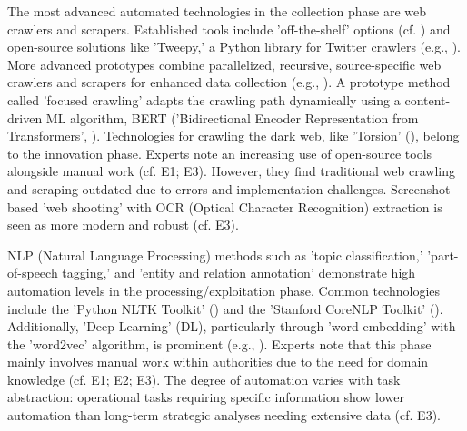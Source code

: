 \documentclass[10pt]{article}
\begin{document}
The most advanced automated technologies in the collection phase are web crawlers and scrapers. Established tools include 'off-the-shelf' options (cf. \cite{Middleton.2020}) and open-source solutions like 'Tweepy,' a Python library for Twitter crawlers (e.g., \cite{Adewopo.2020}). More advanced prototypes combine parallelized, recursive, source-specific web crawlers and scrapers for enhanced data collection (e.g., \cite{Jenkins.2021}). A prototype method called 'focused crawling' adapts the crawling path dynamically using a content-driven ML algorithm, BERT ('Bidirectional Encoder Representation from Transformers', \cite{Kuehn.2023}). Technologies for crawling the dark web, like 'Torsion' (\cite{Sonawane.2022}), belong to the innovation phase. Experts note an increasing use of open-source tools alongside manual work (cf. E1; E3). However, they find traditional web crawling and scraping outdated due to errors and implementation challenges. Screenshot-based 'web shooting' with OCR (Optical Character Recognition) extraction is seen as more modern and robust (cf. E3).

NLP (Natural Language Processing) methods such as 'topic classification,' 'part-of-speech tagging,' and 'entity and relation annotation' demonstrate high automation levels in the processing/exploitation phase. Common technologies include the 'Python NLTK Toolkit' (\cite{Hubbard.2022}) and the 'Stanford CoreNLP Toolkit' (\cite{Middleton.2020}). Additionally, 'Deep Learning' (DL), particularly through 'word embedding' with the 'word2vec' algorithm, is prominent (e.g., \cite{Bai.2020}). Experts note that this phase mainly involves manual work within authorities due to the need for domain knowledge (cf. E1; E2; E3). The degree of automation varies with task abstraction: operational tasks requiring specific information show lower automation than long-term strategic analyses needing extensive data (cf. E3).
\end{document}
